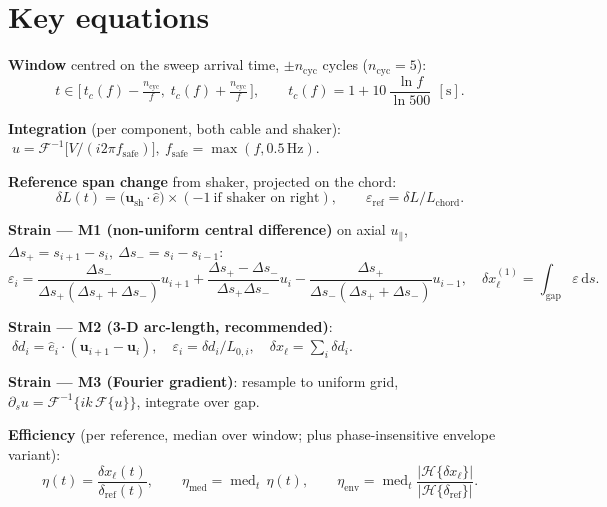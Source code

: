 \documentclass[11pt,a4paper]{article}
\newcommand{\unit}[1]{\,\mathrm{#1}}
\begin{document}
\section*{Key equations}
\textbf{Window} centred on the sweep arrival time, $\pm n_{\mathrm{cyc}}$ cycles ($n_{\mathrm{cyc}}=5$):
\begin{equation}
t\in\big[\,t_c(f)-\tfrac{n_{\mathrm{cyc}}}{f},\;t_c(f)+\tfrac{n_{\mathrm{cyc}}}{f}\,\big],
\qquad t_c(f)=1+10\,\frac{\ln f}{\ln 500}\ \,[\mathrm{s}].
\end{equation}

\textbf{Integration} (per component, both cable and shaker):
$\;u=\mathcal F^{-1}\!\big[V/(i2\pi f_{\mathrm{safe}})\big],\ f_{\mathrm{safe}}=\max(f,0.5\unit{Hz}).$

\textbf{Reference span change} from shaker, projected on the chord:
\begin{equation}
\delta L(t)=\big(\mathbf u_{\mathrm{sh}}\cdot\hat e\big)\times(-1\ \text{if shaker on right}),
\qquad \varepsilon_{\mathrm{ref}}=\delta L/L_{\mathrm{chord}}.
\end{equation}

\textbf{Strain --- M1 (non-uniform central difference)} on axial $u_\parallel$, $\Delta s_+\!=\!s_{i+1}\!-\!s_i,\ \Delta s_-\!=\!s_i\!-\!s_{i-1}$:
\begin{equation}
\varepsilon_i=\frac{\Delta s_-}{\Delta s_+(\Delta s_+\!+\!\Delta s_-)}u_{i+1}
+\frac{\Delta s_+\!-\!\Delta s_-}{\Delta s_+\Delta s_-}u_{i}
-\frac{\Delta s_+}{\Delta s_-(\Delta s_+\!+\!\Delta s_-)}u_{i-1},
\quad \delta x_\ell^{(1)}=\!\!\int_{\mathrm{gap}}\!\!\varepsilon\,\mathrm{d}s.
\end{equation}

\textbf{Strain --- M2 (3-D arc-length, recommended)}:
$\;\delta d_i=\hat e_i\!\cdot(\mathbf u_{i+1}-\mathbf u_i),\quad \varepsilon_i=\delta d_i/L_{0,i},\quad \delta x_\ell=\sum_i\delta d_i.$

\textbf{Strain --- M3 (Fourier gradient)}: resample to uniform grid, $\partial_s u=\mathcal F^{-1}\{ik\,\mathcal F\{u\}\}$, integrate over gap.

\textbf{Efficiency} (per reference, median over window; plus phase-insensitive envelope variant):
\begin{equation}
\eta(t)=\frac{\delta x_\ell(t)}{\delta_{\mathrm{ref}}(t)},\qquad
\eta_{\mathrm{med}}=\operatorname{med}_t\,\eta(t),\qquad
\eta_{\mathrm{env}}=\operatorname{med}_t\frac{|\mathcal H\{\delta x_\ell\}|}{|\mathcal H\{\delta_{\mathrm{ref}}\}|}.
\end{equation}
\end{document}
